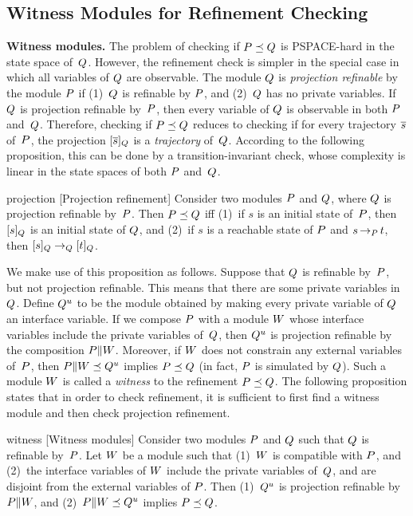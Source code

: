 \subsection{Witness Modules for Refinement Checking}
{\bf Witness modules.}
The problem of checking if ${P}\preceq{Q}$ is PSPACE-hard in the state
space of~${Q}$.  However, the refinement check is simpler in the special
case in which all variables of ${Q}$ are observable.  The module ${Q}$ is
{\em projection refinable\/} by the module ${P}$ if (1)~${Q}$ is refinable
by ${P}$, and (2)~${Q}$ has no private variables.  If ${Q}$ is projection
refinable by~${P}$, then every variable of ${Q}$ is observable in both ${P}$
and~${Q}$.  Therefore, checking if ${P}\preceq{Q}$ reduces to checking if
for every trajectory ${\overline{s}}$ of~${P}$, the projection $[{\overline{s}}]_{Q}$
is a {\em trajectory\/} of~${Q}$.  According to the following proposition,
this can be done by a transition-invariant check, whose complexity is
linear in the state spaces of both ${P}$ and~${Q}$.

\begin {proposition}{projection}
  [Projection refinement]
  Consider two modules ${P}$ and ${Q}$, where ${Q}$ is projection refinable 
  by~${P}$.
  Then ${P} \preceq {Q}$ iff 
  (1)~if $s$ is an initial state of~${P}$, then $[s]_{Q}$
        is an initial state of ${Q}$, and
  (2)~if $s$ is a reachable state of ${P}$ and $s\, {\rightarrow}_{P}\, t$,
	then $[s]_{Q} \rightarrow_{Q} [t]_{Q}$.
\end {proposition}

\mypar
\noindent
We make use of this proposition as follows.  Suppose that ${Q}$ is refinable
by~${P}$, but not projection refinable.  This means that there are some
private variables in ${Q}$.  Define ${Q}^u$ to be the module obtained by
making every private variable of ${Q}$ an interface variable.  If we compose
${P}$ with a module ${W}$ whose interface variables include the private
variables of~${Q}$, then ${Q}^u$ is projection refinable by the
composition ${P}\|{W}$.  Moreover, if ${W}$ does not constrain any external
variables of~${P}$, then ${P}\|{W}\preceq{Q}^u$ implies
${P}\preceq{Q}$ (in fact, ${P}$ is simulated by ${Q}$). 
Such a module ${W}$ is called a {\em witness\/} to the
refinement ${P}\preceq{Q}$.  The following proposition states that in order
to check refinement, it is sufficient to first find a witness module and then
check projection refinement.

\begin {proposition}{witness}
  [Witness modules]
  Consider two modules ${P}$ and ${Q}$ such that ${Q}$ is refinable 
  by~${P}$.
  Let ${W}$ be a module such that (1)~${W}$ is compatible with
  ${P}$, and (2)~the interface 
  variables of ${W}$ include the private variables of~${Q}$, and are disjoint
  from the external variables of ${P}$.
  Then (1)~${Q}^u$ is projection refinable by ${P} \| {W}$, and 
  (2)~${P}\|{W}\preceq {Q}^u$ implies ${P}\preceq{Q}$.
\end{proposition}

